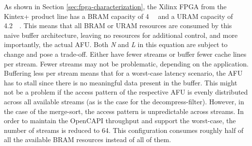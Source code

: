 As shown in Section \ref{sec:fpga-characterization}, the Xilinx FPGA from the Kintex+ product line has a BRAM capacity of \SI{4}{\mega\byte} and a URAM capacity of \SI{4.2}{\mega\byte}. This means that all BRAM or URAM resources are consumed by this naive buffer architecture, leaving no resources for additional control, and more importantly, the actual AFU. Both \textit{N} and \textit{L} in this equation are subject to change and pose a trade-off. Either have fewer streams or buffer fewer cache lines per stream. Fewer streams may not be problematic, depending on the application. Buffering less per stream means that for a worst-case latency scenario, the AFU has to stall since there is no meaningful data present in the buffer. This might not be a problem if the access pattern of the respective AFU is evenly distributed across all available streams (as is the case for the decompress-filter). However, in the case of the merge-sort, the access pattern is unpredictable across streams. In order to maintain the OpenCAPI throughput and support the worst-case, the number of streams is reduced to 64. This configuration consumes roughly half of all the available BRAM resources instead of all of them.



